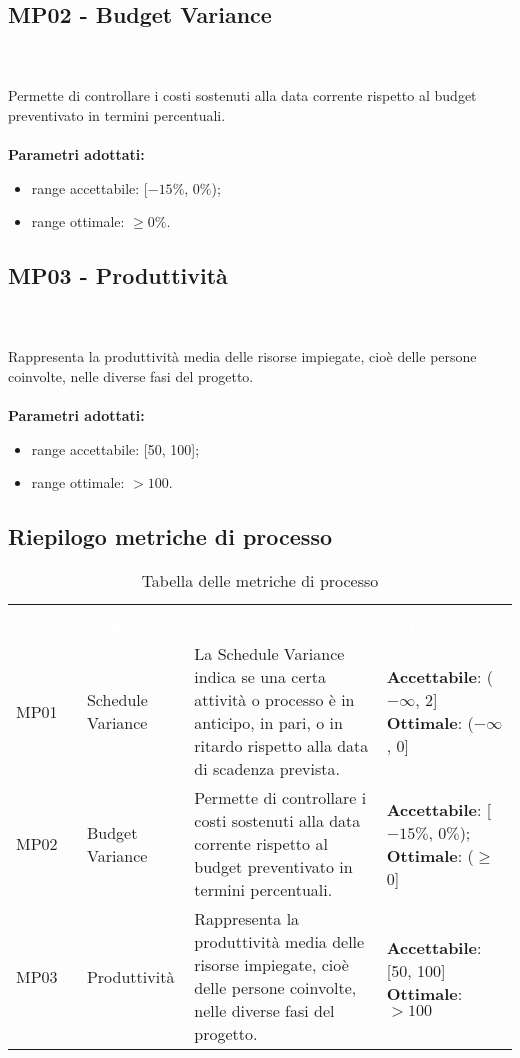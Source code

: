 \subsection{MP02 - Budget Variance} \mbox{} \\ \mbox{} \\
Permette di controllare i costi sostenuti alla data corrente rispetto al budget preventivato in termini percentuali. \\ \\ 
\textbf{Parametri adottati:}  
\begin{itemize}
\item range accettabile: [$-15\%$, $0\%$); 
\item range ottimale: $ \geq 0\%$.
\end{itemize}

\subsection{MP03 - Produttività} \mbox{} \\ \mbox{} \\
Rappresenta la produttività media delle risorse impiegate, cioè delle persone coinvolte, nelle diverse fasi del progetto. \\ \\ 
\textbf{Parametri adottati:} 
\begin{itemize}
	\item range accettabile: [50, 100];
	\item range ottimale: $ > 100$.
\end{itemize}

\begin{comment}
Cambiate in subsection i paragraph MP01/2/3
\end{comment}
\newpage
\subsection*{Riepilogo metriche di processo}
\begin{longtable}{C{3cm} C{4cm} L{4cm} C{3cm}}
\caption{Tabella delle metriche di processo}\\
	\textcolor{white}{\textbf{Codice}} &
	\textcolor{white}{\textbf{Nome}} &
	\textcolor{white}{\textbf{Descrizione}} &
	\textcolor{white}{\textbf{Range}} \\
MP01 &
Schedule Variance &
La Schedule Variance indica se una certa attività o processo è in anticipo, in pari, o in ritardo
rispetto alla data di scadenza prevista. &
\textbf{Accettabile}: ($ -\infty $, 2]
\textbf{Ottimale}: ($ -\infty $, 0] \\
MP02 &
Budget Variance &
Permette di controllare i costi sostenuti alla data corrente rispetto al budget preventivato in termini percentuali. &
\textbf{Accettabile}: [$-15\%$, $0\%$); 
\textbf{Ottimale}: ($ \geq $ 0] \\
MP03 &
Produttività &
Rappresenta la produttività media delle risorse impiegate, cioè delle persone coinvolte, nelle diverse fasi del progetto. &
\textbf{Accettabile}: [50, 100]
\textbf{Ottimale}: $ > 100$

\end{longtable}
